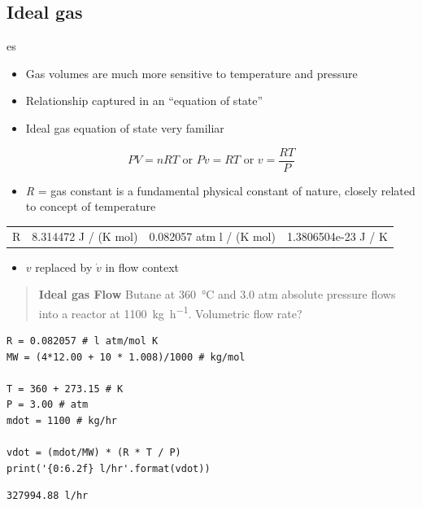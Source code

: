 \documentclass[11pt]{article}
\begin{document}
\subsection{Ideal gas}
\label{sec-7-2}

es
\begin{itemize}
\item Gas volumes are much more sensitive to temperature and pressure
\item Relationship captured in an ``equation of state''
\item Ideal gas equation of state very familiar
\end{itemize}

\[ P V = n R T \text{ or } P v = R T \text{ or } v = \frac{RT}{P} \]

\begin{itemize}
\item \emph{R} = gas constant is a fundamental physical constant of nature, closely related to concept of temperature
\end{itemize}

\begin{center}
\begin{tabular}{llll}
R & 8.314472 J / (K mol) & 0.082057 atm l / (K mol) & 1.3806504e-23 J / K\\
\end{tabular}
\end{center}
\begin{itemize}
\item \(v\) replaced by \(\dot{v}\) in flow context
\end{itemize}

\begin{quote}
\hline
\textbf{Ideal gas Flow} Butane at \SI{360}{\celsius} and 3.0 atm absolute pressure flows into a reactor at \SI{1100}{\kilogram\per\hour}.  Volumetric flow rate?
\hline
\end{quote}
\begin{verbatim}
R = 0.082057 # l atm/mol K
MW = (4*12.00 + 10 * 1.008)/1000 # kg/mol

T = 360 + 273.15 # K
P = 3.00 # atm
mdot = 1100 # kg/hr

vdot = (mdot/MW) * (R * T / P)
print('{0:6.2f} l/hr'.format(vdot))
\end{verbatim}

\begin{verbatim}
327994.88 l/hr
\end{verbatim}
\end{document}
